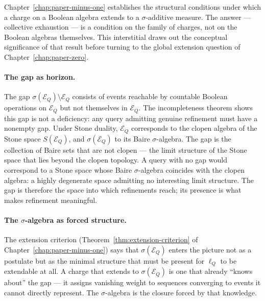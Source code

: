 
Chapter~\ref{chap:paper-minus-one} establishes the structural conditions under which
a charge on a Boolean algebra extends to a $\sigma$-additive measure.  The answer ---
collective exhaustion --- is a condition on the family of charges, not on the Boolean
algebras themselves.  This interstitial draws out the conceptual significance of that
result before turning to the global extension question of Chapter~\ref{chap:paper-zero}.

\medskip

\paragraph{The gap as horizon.}
The gap $\sigma(\mathcal{E}_Q) \setminus \mathcal{E}_Q$ consists of events reachable
by countable Boolean operations on $\mathcal{E}_Q$ but not themselves in
$\mathcal{E}_Q$.  The incompleteness theorem shows this gap is not a deficiency: any
query admitting genuine refinement must have a nonempty gap.  Under Stone duality,
$\mathcal{E}_Q$ corresponds to the clopen algebra of the Stone space $S(\mathcal{E}_Q)$,
and $\sigma(\mathcal{E}_Q)$ to its Baire $\sigma$-algebra.  The gap is the collection
of Baire sets that are not clopen --- the limit structure of the Stone space that lies
beyond the clopen topology.  A query with no gap would correspond to a Stone space
whose Baire $\sigma$-algebra coincides with the clopen algebra: a highly degenerate
space admitting no interesting limit structure.  The gap is therefore the space into
which refinements reach; its presence is what makes refinement meaningful.

\paragraph{The $\sigma$-algebra as forced structure.}
The extension criterion (Theorem~\ref{thm:extension-criterion} of
Chapter~\ref{chap:paper-minus-one}) says that $\sigma(\mathcal{E}_Q)$ enters the
picture not as a postulate but as the minimal structure that must be present for
$\ell_Q$ to be extendable at all.  A charge that extends to $\sigma(\mathcal{E}_Q)$
is one that already ``knows about'' the gap --- it assigns vanishing weight to
sequences converging to events it cannot directly represent.  The $\sigma$-algebra is
the closure forced by that knowledge.

